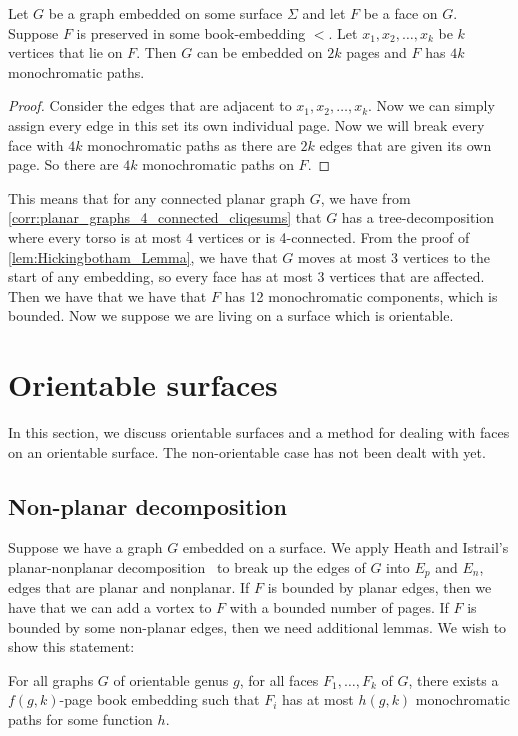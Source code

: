 \begin{theorem}\label{thm:embedded_graph}
	Let \( G \) be a graph embedded on some surface \(\Sigma \) and let \(F\) be a face on \(G\). Suppose \(F \) is preserved in some book-embedding \( < \). Let \(x_1, x_2, \ldots, x_k \) be \(k \) vertices that lie on \(F \). Then $G$ can be embedded on $2k$ pages and \(F\) has \( 4k \) monochromatic paths.
\end{theorem}

\begin{proof}
	Consider the edges that are adjacent to \(x_1, x_2, \ldots, x_k \). Now we can simply assign every edge in this set its own individual page. Now we will break every face with $4k$ monochromatic paths as there are $2k$ edges that are given its own page. So there are $4k$ monochromatic paths on $F$.
\end{proof}

This means that for any connected planar graph \(G \), we have from \cref{corr:planar_graphs_4_connected_cliqesums} that \(G\) has a tree-decomposition where every torso is at most 4 vertices or is 4-connected. From the proof of \cref{lem:Hickingbotham_Lemma}, we have that \(G\) moves at most 3 vertices to the start of any embedding, so every face has at most 3 vertices that are affected. Then we have that we have that \(F \) has 12 monochromatic components, which is bounded. Now we suppose we are living on a surface which is orientable.

\section{Orientable surfaces}
In this section, we discuss orientable surfaces and a method for dealing with faces on an orientable surface. The non-orientable case has not been dealt with yet. 
\subsection{Non-planar decomposition}
Suppose we have a graph \(G\) embedded on a surface. We apply Heath and Istrail's planar-nonplanar decomposition~\cite{heathPagenumberGenusGraphs1992} to break up the edges of \(G\) into \(E_p\) and \(E_n\), edges that are planar and nonplanar. If \(F\) is bounded by planar edges, then we have that we can add a vortex to \(F\) with a bounded number of pages. If \(F\) is bounded by some non-planar edges, then we need additional lemmas.
We wish to show this statement:
\begin{theorem}
	For all graphs \(G\) of orientable genus \(g\), for all faces \(F_1, \ldots, F_k\) of \(G\), there exists a \(f(g, k)\)-page book embedding such that \(F_i\) has at most \( h(g, k)\) monochromatic paths for some function $h$.
\end{theorem}

